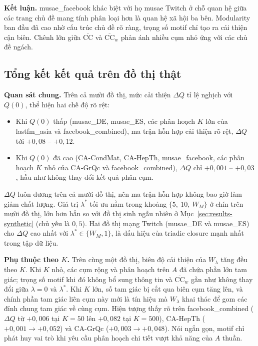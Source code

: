 \textbf{Kết luận.} musae\_facebook khác biệt với họ musae Twitch ở chỗ quan hệ giữa các trang chủ đề mang tính phân loại hơn là quan hệ xã hội ba bên. Modularity ban đầu đã cao nhờ cấu trúc chủ đề rõ ràng, trọng số motif chỉ tạo ra cải thiện cận biên. Chênh lớn giữa $\overline{\mathrm{CC}}$ và $\overline{\mathrm{CC}}_w$ phản ánh nhiều cụm nhỏ ứng với các chủ đề ngách.

\subsection*{Tổng kết kết quả trên đồ thị thật}
\label{subsec:summary-real}

\textbf{Quan sát chung.} Trên cả mười đồ thị, mức cải thiện $\Delta Q$ tỉ lệ nghịch với $Q(0)$, thể hiện hai chế độ rõ rệt:
\begin{itemize}
    \item Khi $Q(0)$ thấp (musae\_DE, musae\_ES, các phân hoạch $K$ lớn của lastfm\_asia và facebook\_combined), ma trận hỗn hợp cải thiện rõ rệt, $\Delta Q$ tới $+0{,}08$ -- $+0{,}12$.
    \item Khi $Q(0)$ đã cao (CA-CondMat, CA-HepTh, musae\_facebook, các phân hoạch $K$ nhỏ của CA-GrQc và facebook\_combined), $\Delta Q$ chỉ $+0{,}001$ -- $+0{,}03$, hầu như không thay đổi kết quả phân cụm.
\end{itemize}
$\Delta Q$ luôn dương trên cả mười đồ thị, nên ma trận hỗn hợp không bao giờ làm giảm chất lượng. Giá trị $\lambda^*$ tối ưu nằm trong khoảng $\{5,\ 10,\ W_M\}$ ở chín trên mười đồ thị, lớn hơn hẳn so với đồ thị sinh ngẫu nhiên ở Mục~\ref{sec:results-synthetic} (chủ yếu là $0{,}5$). Hai đồ thị mạng Twitch (musae\_DE và musae\_ES) cho $\Delta Q$ cao nhất với $\lambda^* \in \{W_M, 1\}$, là dấu hiệu của triadic closure mạnh nhất trong tập dữ liệu.

\textbf{Phụ thuộc theo $K$.} Trên cùng một đồ thị, biên độ cải thiện của $W_\lambda$ tăng đều theo $K$. Khi $K$ nhỏ, các cụm rộng và phân hoạch trên $A$ đã chứa phần lớn tam giác; trọng số motif khi đó không bổ sung thông tin và $\overline{\mathrm{CC}}_w$ gần như không thay đổi giữa $\lambda = 0$ và $\lambda^*$. Khi $K$ lớn, số tam giác bị cắt qua biên cụm tăng lên, và chính phần tam giác liên cụm này mới là tín hiệu mà $W_\lambda$ khai thác để gom các đỉnh chung tam giác về cùng cụm. Hiện tượng thấy rõ trên facebook\_combined ($\Delta Q$ từ $+0{,}006$ tại $K=50$ lên $+0{,}082$ tại $K=500$), CA-HepTh ($+0{,}001 \to +0{,}052$) và CA-GrQc ($+0{,}003 \to +0{,}048$). Nói ngắn gọn, motif chỉ phát huy vai trò khi yêu cầu phân hoạch chi tiết vượt khả năng của $A$ thuần.

